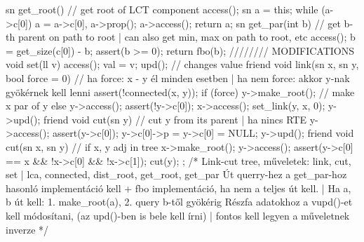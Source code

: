 {	sn get_root() { // get root of LCT component
		access(); sn a = this;
		while (a->c[0]) a = a->c[0], a->prop();
		a->access();
		return a;
	}
	sn get_par(int b) {  // get b-th parent on path to root | can also get min, max on path to root, etc
		access(); b = get_size(c[0]) - b;
		assert(b >= 0);
		return fbo(b);
	} 
	//////// MODIFICATIONS
	void set(ll v) { access(); val = v; upd(); } // changes value
	friend void link(sn x, sn y, bool force = 0) { // ha force: x - y él minden esetben | ha nem force: akkor y-nak gyökérnek kell lenni
		assert(!connected(x, y));
		if (force) y->make_root();  // make x par of y
		else { y->access(); assert(!y->c[0]); }
		x->access(); set_link(y, x, 0); y->upd();
	}
	friend void cut(sn y) {  // cut y from its parent | ha nincs RTE
		y->access();
		assert(y->c[0]);
		y->c[0]->p = y->c[0] = NULL;
		y->upd();
	}
	friend void cut(sn x, sn y) {  // if x, y adj in tree
		x->make_root(); y->access();
		assert(y->c[0] == x && !x->c[0] && !x->c[1]);
		cut(y);
	}
};
/*
Link-cut tree, műveletek: link, cut, set | lca, connected, dist_root, get_root, get_par
Út querry-hez a get_par-hoz hasonló implementáció kell + fbo implementáció, ha nem a teljes út kell. | Ha a, b út kell: 1. make_root(a), 2. query b-től gyökérig
Részfa adatokhoz a vupd()-et kell módosítani, (az upd()-ben is bele kell írni) | fontos kell legyen a műveletnek inverze 
*/